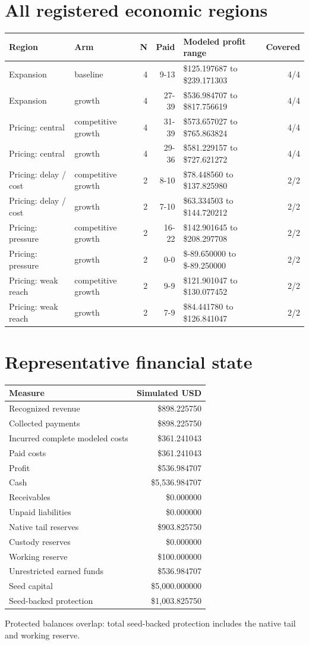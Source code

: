 \documentclass[10pt,letterpaper]{article}
\begin{document}
\section{All registered economic regions}
\small\begin{longtable}{@{}p{2.55cm}p{2.4cm}r r p{4.1cm}r@{}}
\toprule Region & Arm & N & Paid & Modeled profit range & Covered \\ \midrule\endhead
Expansion & baseline & 4 & 9-13 & \$125.197687 to \$239.171303 & 4/4 \\
Expansion & growth & 4 & 27-39 & \$536.984707 to \$817.756619 & 4/4 \\
Pricing: central & competitive growth & 4 & 31-39 & \$573.657027 to \$765.863824 & 4/4 \\
Pricing: central & growth & 4 & 29-36 & \$581.229157 to \$727.621272 & 4/4 \\
Pricing: delay / cost & competitive growth & 2 & 8-10 & \$78.448560 to \$137.825980 & 2/2 \\
Pricing: delay / cost & growth & 2 & 7-10 & \$63.334503 to \$144.720212 & 2/2 \\
Pricing: pressure & competitive growth & 2 & 16-22 & \$142.901645 to \$208.297708 & 2/2 \\
Pricing: pressure & growth & 2 & 0-0 & \$-89.650000 to \$-89.250000 & 2/2 \\
Pricing: weak reach & competitive growth & 2 & 9-9 & \$121.901047 to \$130.077452 & 2/2 \\
Pricing: weak reach & growth & 2 & 7-9 & \$84.441780 to \$126.841047 & 2/2 \\
\bottomrule\end{longtable}\normalsize
\clearpage\section{Representative financial state}
\begin{longtable}{@{}lr@{}}\toprule Measure & Simulated USD \\ \midrule\endhead
Recognized revenue & \$898.225750 \\
Collected payments & \$898.225750 \\
Incurred complete modeled costs & \$361.241043 \\
Paid costs & \$361.241043 \\
Profit & \$536.984707 \\
Cash & \$5,536.984707 \\
Receivables & \$0.000000 \\
Unpaid liabilities & \$0.000000 \\
Native tail reserves & \$903.825750 \\
Custody reserves & \$0.000000 \\
Working reserve & \$100.000000 \\
Unrestricted earned funds & \$536.984707 \\
Seed capital & \$5,000.000000 \\
Seed-backed protection & \$1,003.825750 \\
\bottomrule\end{longtable}
\small Protected balances overlap: total seed-backed protection includes the native tail and working reserve.\normalsize
\end{document}
